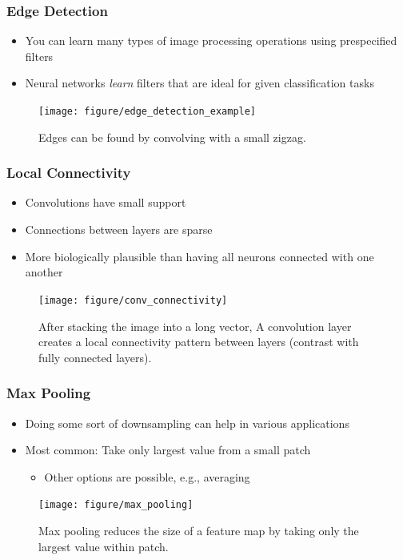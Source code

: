 \documentclass[10pt,mathserif]{beamer}
\begin{document}
\begin{frame}
  \frametitle{Edge Detection}
  \begin{itemize}
    \item You can learn many types of image processing operations using
      prespecified filters
    \item Neural networks \textit{learn} filters that are ideal for given
      classification tasks
  \end{itemize}
  \begin{figure}[ht]
    \centering
    \texttt{[image: figure/edge\_detection\_example]}
    \caption{Edges can be found by convolving with a small
      zigzag. \label{fig:edges_example} }
  \end{figure}
\end{frame}

\begin{frame}
  \frametitle{Local Connectivity}
  \begin{itemize}
  \item Convolutions have small support
  \item Connections between layers are sparse
  \item More biologically plausible than having all neurons connected with one
    another
  \end{itemize}
  \begin{figure}[ht]
    \centering
    \texttt{[image: figure/conv\_connectivity]}
    \caption{After stacking the image into a long vector, A convolution layer
      creates a local connectivity pattern between layers (contrast with fully
      connected layers). \label{fig:conv_connectivity} }
  \end{figure}
\end{frame}

\begin{frame}
  \frametitle{Max Pooling}
  \begin{itemize}
  \item Doing some sort of downsampling can help in various applications
  \item Most common: Take only largest value from a small patch
    \begin{itemize}
    \item Other options are possible, e.g., averaging
    \end{itemize}
  \end{itemize}
  \begin{figure}
    \centering
    \texttt{[image: figure/max\_pooling]}
    \caption{Max pooling reduces the size of a feature map by taking only the
      largest value within patch.
      \label{fig:max_pooling}}
  \end{figure}
\end{frame}
\end{document}
